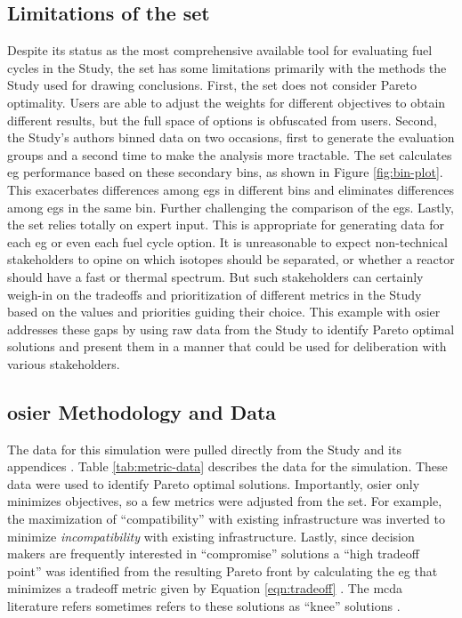 \FloatBarrier

\subsection{Limitations of the \ac{set}} Despite its status as the most
comprehensive available tool for evaluating fuel cycles in the Study, the
\ac{set} has some limitations primarily with the methods the Study used for
drawing conclusions. First, the \ac{set} does not consider Pareto optimality.
Users are able to adjust the weights for different objectives to obtain
different results, but the full space of options is obfuscated from users.
Second, the Study's authors binned data on two occasions, first to generate the
evaluation groups and a second time to make the analysis more tractable. The
\ac{set} calculates \ac{eg} performance based on these secondary bins, as shown
in Figure \ref{fig:bin-plot}. This exacerbates differences among \acp{eg} in
different bins and eliminates differences among \acp{eg} in the same bin.
Further challenging the comparison of the \acp{eg}. Lastly, the \ac{set} relies
totally on expert input. This is appropriate for generating data for each
\ac{eg} or even each fuel cycle option. It is unreasonable to expect
non-technical stakeholders to opine on which isotopes should be separated, or
whether a reactor should have a fast or thermal spectrum. But such stakeholders
can certainly weigh-in on the tradeoffs and prioritization of different metrics
in the Study based on the values and priorities guiding their choice. This
example with \ac{osier} addresses these gaps by using raw data from the Study to
identify Pareto optimal solutions and present them in a manner that could be
used for deliberation with various stakeholders. 

\subsection{\ac{osier} Methodology and Data}

The data for this simulation were pulled directly from the Study and its
appendices
\cite{wigeland_nuclear_2014,wigeland_nuclear_2014-2,wigeland_nuclear_2014-1}.
Table \ref{tab:metric-data} describes the data for the simulation. These data
were used to identify Pareto optimal solutions.  Importantly, \ac{osier} only
minimizes objectives, so a few metrics were adjusted from the \ac{set}. For
example, the maximization of ``compatibility'' with existing infrastructure was
inverted to minimize \textit{incompatibility} with existing infrastructure.
Lastly, since decision makers are frequently interested in ``compromise''
solutions a ``high tradeoff point'' was identified from the resulting Pareto
front by calculating the \ac{eg} that minimizes a tradeoff metric given by
Equation \ref{eqn:tradeoff} \cite{rachmawati_multiobjective_2009}. The \ac{mcda}
literature refers sometimes refers to these solutions as ``knee'' solutions
\cite{rachmawati_multiobjective_2009}.

